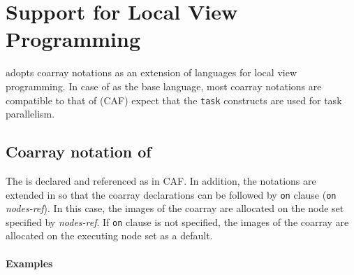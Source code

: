 \chapter{Support for Local View Programming}

\XMP adopts coarray notations as
an extension of languages for local view programming. In case of
\Fort as the base language, most coarray notations are compatible to
that of \CAF (CAF) expect that the {\tt task} constructs
are used for task parallelism.

\section{Coarray notation of  \XMP}

The  is declared and referenced as in CAF. In addition, the
notations are extended in \XMP so that the coarray declarations
can be followed by {\tt on} clause ({\tt on} {\it nodes-ref}). In this
case, the images of the coarray are allocated on the node set specified by
{\it nodes-ref}. If {\tt on} clause is not specified, the images of
the coarray are allocated on the executing node set as a default.

\subsubsection*{Examples}

